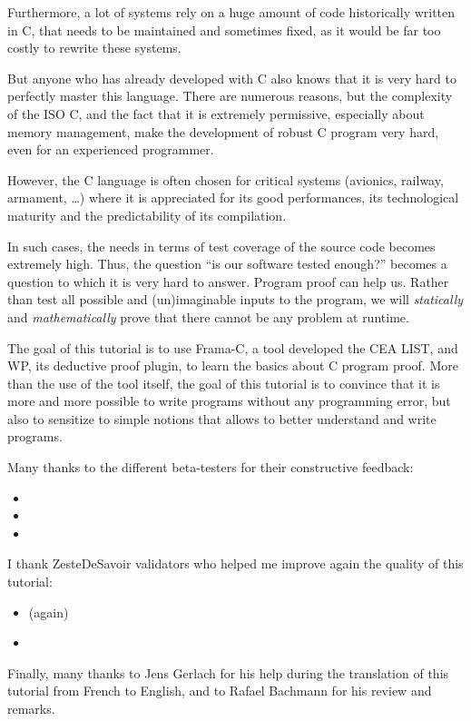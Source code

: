 Furthermore, a lot of systems rely on a huge amount of code historically
written in C, that needs to be maintained and sometimes fixed, as it
would be far too costly to rewrite these systems.


But anyone who has already developed with C also knows that it is very
hard to perfectly master this language. There are numerous reasons, but
the complexity of the ISO C, and the fact that it is extremely permissive,
especially about memory management, make the development of robust C
program very hard, even for an experienced programmer.



However, the C language is often chosen for critical systems (avionics,
railway, armament, \ldots{}) where it is appreciated for its good
performances, its technological maturity and the predictability of its
compilation.



In such cases, the needs in terms of test coverage of the source code
becomes extremely high. Thus, the question ``is our software tested
enough?'' becomes a question to which it is very hard to answer. Program
proof can help us.
Rather than test all possible and (un)imaginable inputs to the program,
we will \emph{statically} and \emph{mathematically} prove that there
cannot be any problem at runtime.



The goal of this tutorial is to use Frama-C, a tool developed the CEA
LIST, and WP, its deductive proof plugin, to learn the basics about C
program proof. More than the use of the tool itself, the goal of this
tutorial is to convince that it is more and more possible to write
programs without any programming error, but also to sensitize to simple
notions that allows to better understand and write programs.



\begin{Information}
  Many thanks to the different beta-testers for their constructive
  feedback:

\begin{itemize}
\item {}
\item {}
\item {}
\end{itemize}
  I thank ZesteDeSavoir validators who helped me improve again the quality of
  this tutorial:

\begin{itemize}
\item {} (again)
\item {}
\end{itemize}
  Finally, many thanks to Jens Gerlach for his help during the translation of
  this tutorial from French to English, and to Rafael Bachmann for his review
  and remarks.
\end{Information}
